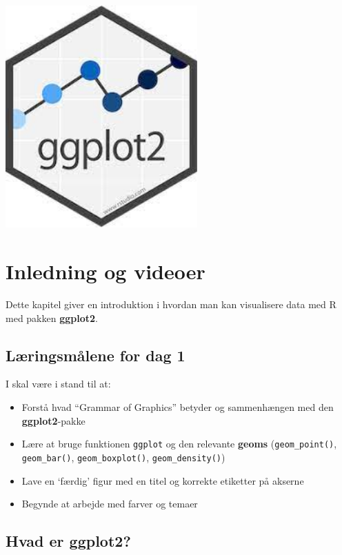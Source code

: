 \documentclass[
]{book}
\providecommand{\tightlist}{%
  \setlength{\itemsep}{0pt}\setlength{\parskip}{0pt}}
\begin{document}
\includegraphics[width=2.9in]{plots/ggplot2_logo}

\hypertarget{inledning-og-videoer}{%
\section{Inledning og videoer}\label{inledning-og-videoer}}

Dette kapitel giver en introduktion i hvordan man kan visualisere data med R med pakken \textbf{ggplot2}.

\hypertarget{luxe6ringsmuxe5lene-for-dag-1}{%
\subsection{Læringsmålene for dag 1}\label{luxe6ringsmuxe5lene-for-dag-1}}

I skal være i stand til at:

\begin{itemize}
\tightlist
\item
  Forstå hvad ``Grammar of Graphics'' betyder og sammenhængen med den \textbf{ggplot2}-pakke
\item
  Lære at bruge funktionen \texttt{ggplot} og den relevante \textbf{geoms} (\texttt{geom\_point()}, \texttt{geom\_bar()}, \texttt{geom\_boxplot()}, \texttt{geom\_density()})
\item
  Lave en `færdig' figur med en titel og korrekte etiketter på akserne
\item
  Begynde at arbejde med farver og temaer
\end{itemize}

\hypertarget{hvad-er-ggplot2}{%
\subsection{\texorpdfstring{Hvad er \textbf{ggplot2}?}{Hvad er ggplot2?}}\label{hvad-er-ggplot2}}
\end{document}
